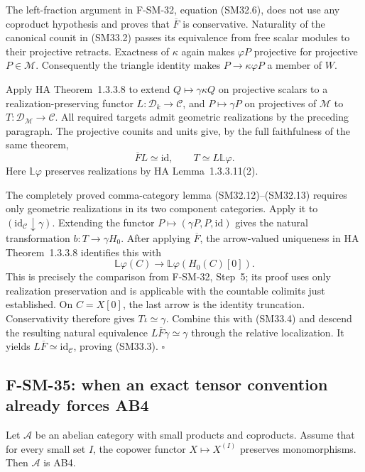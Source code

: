 The left-fraction argument in F-SM-32, equation (SM32.6),
does not use any coproduct hypothesis and proves that
\(\overline F\) is conservative.  Naturality of the
canonical counit in (SM33.2) passes its equivalence from
free scalar modules to their projective retracts.
Exactness of \(\kappa\) again makes \(\varphi P\)
projective for projective \(P\in\mathcal M\).
Consequently the triangle identity makes
\(P\to\kappa\varphi P\) a member of \(W\).

Apply HA Theorem~1.3.3.8 to extend
\(Q\mapsto\gamma\kappa Q\) on projective scalars to a
realization-preserving functor \(L:\mathcal D_k\to\mathcal C\),
and \(P\mapsto\gamma P\) on projectives of \(\mathcal M\)
to \(T:\mathcal D_{\mathcal M}\to\mathcal C\).
All required targets admit geometric realizations by the
preceding paragraph.  The projective counits and units give,
by the full faithfulness of the same theorem,
\[
                 \overline F L\simeq\mathrm{id},\qquad
                         T\simeq L\mathbb L\varphi.           \tag{SM33.4}
\]
Here \(\mathbb L\varphi\) preserves realizations by
HA Lemma~1.3.3.11(2).

The completely proved comma-category lemma (SM32.12)--(SM32.13)
requires only geometric realizations in its two component
categories.  Apply it to
\((\mathrm{id}_{\mathcal C}\downarrow\gamma)\).
Extending the functor \(P\mapsto(\gamma P,P,\mathrm{id})\)
gives the natural transformation \(b:T\to\gamma H_0\).
After applying \(\overline F\), the arrow-valued uniqueness
in HA Theorem~1.3.3.8 identifies this with
\[
          \mathbb L\varphi(C)\longrightarrow
                          \mathbb L\varphi(H_0(C)[0]).
\]
This is precisely the comparison from F-SM-32, Step~5;
its proof uses only realization preservation and is
applicable with the countable colimits just established.
On \(C=X[0]\), the last arrow is the identity truncation.
Conservativity therefore gives \(T\iota\simeq\gamma\).
Combine this with (SM33.4) and descend the resulting natural
equivalence \(L\overline F\gamma\simeq\gamma\) through
the relative localization.  It yields
\(L\overline F\simeq\mathrm{id}_{\mathcal C}\), proving
(SM33.3). \(\square\)

\subsection{F-SM-35: when an exact tensor convention already forces AB4}
Let \(\mathcal A\) be an abelian category with small products
and coproducts.  Assume that for every small set \(I\), the
copower functor \(X\mapsto X^{(I)}\) preserves monomorphisms.
Then \(\mathcal A\) is AB4.

